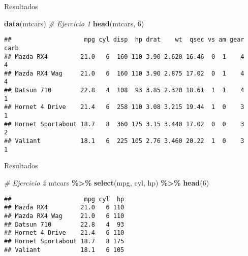 \documentclass[
  ignorenonframetext,
]{beamer}
\newenvironment{Shaded}{\begin{snugshade}}{\end{snugshade}}
\newcommand{\CommentTok}[1]{\textcolor[rgb]{0.56,0.35,0.01}{\textit{#1}}}
\newcommand{\DecValTok}[1]{\textcolor[rgb]{0.00,0.00,0.81}{#1}}
\newcommand{\FunctionTok}[1]{\textcolor[rgb]{0.13,0.29,0.53}{\textbf{#1}}}
\newcommand{\NormalTok}[1]{#1}
\newcommand{\SpecialCharTok}[1]{\textcolor[rgb]{0.81,0.36,0.00}{\textbf{#1}}}
\begin{document}
\begin{frame}[fragile]{Resultados}
\label{resultados-5}
\begin{Shaded}
\begin{Highlighting}[]
\FunctionTok{data}\NormalTok{(mtcars)}
\CommentTok{\# Ejercicio 1}
\FunctionTok{head}\NormalTok{(mtcars, }\DecValTok{6}\NormalTok{)}
\end{Highlighting}
\end{Shaded}

\begin{verbatim}
##                    mpg cyl disp  hp drat    wt  qsec vs am gear carb
## Mazda RX4         21.0   6  160 110 3.90 2.620 16.46  0  1    4    4
## Mazda RX4 Wag     21.0   6  160 110 3.90 2.875 17.02  0  1    4    4
## Datsun 710        22.8   4  108  93 3.85 2.320 18.61  1  1    4    1
## Hornet 4 Drive    21.4   6  258 110 3.08 3.215 19.44  1  0    3    1
## Hornet Sportabout 18.7   8  360 175 3.15 3.440 17.02  0  0    3    2
## Valiant           18.1   6  225 105 2.76 3.460 20.22  1  0    3    1
\end{verbatim}
\end{frame}

\begin{frame}[fragile]{Resultados}
\label{resultados-6}
\begin{Shaded}
\begin{Highlighting}[]
\CommentTok{\# Ejercicio 2}
\NormalTok{mtcars }\SpecialCharTok{\%\textgreater{}\%}
  \FunctionTok{select}\NormalTok{(mpg, cyl, hp) }\SpecialCharTok{\%\textgreater{}\%} 
  \FunctionTok{head}\NormalTok{(}\DecValTok{6}\NormalTok{)}
\end{Highlighting}
\end{Shaded}

\begin{verbatim}
##                    mpg cyl  hp
## Mazda RX4         21.0   6 110
## Mazda RX4 Wag     21.0   6 110
## Datsun 710        22.8   4  93
## Hornet 4 Drive    21.4   6 110
## Hornet Sportabout 18.7   8 175
## Valiant           18.1   6 105
\end{verbatim}
\end{frame}
\end{document}

